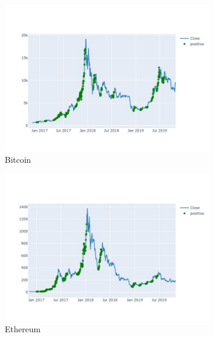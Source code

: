 \documentclass[letterpaper]{article}
\begin{document}
\begin{figure}[H]
    \centering
    \begin{subfigure}[b]{0.45\linewidth}
      \includegraphics[width=\linewidth]{images/BTC.jpg}
      \caption{Bitcoin}
      \label{fig:bitcoin}
    \end{subfigure}
    \begin{subfigure}[b]{0.45\linewidth}
      \includegraphics[width=\linewidth]{images/ETH.jpg}
      \caption{Ethereum}  
      \label{fig:ethereum}
    \end{subfigure}
    \begin{subfigure}[b]{0.45\linewidth}

\end{subfigure}
\end{figure}
\end{document}
